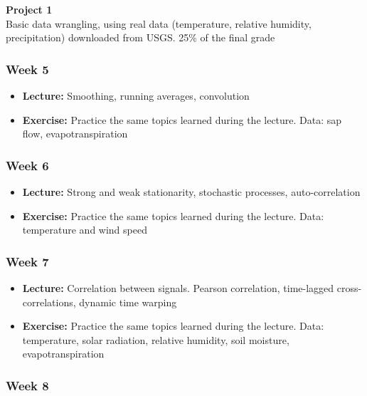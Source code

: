 \documentclass[
  letterpaper,
  DIV=11,
  numbers=noendperiod,
  oneside]{scrreprt}
\providecommand{\tightlist}{%
  \setlength{\itemsep}{0pt}\setlength{\parskip}{0pt}}\usepackage{longtable,booktabs,array}
\begin{document}
\textbf{Project 1}\\
Basic data wrangling, using real data (temperature, relative humidity,
precipitation) downloaded from USGS. 25\% of the final grade

\hypertarget{week-5}{%
\subsubsection*{Week 5}\label{week-5}}

\begin{itemize}
\tightlist
\item
  \textbf{Lecture:} Smoothing, running averages, convolution
\item
  \textbf{Exercise:} Practice the same topics learned during the
  lecture. Data: sap flow, evapotranspiration
\end{itemize}

\hypertarget{week-6}{%
\subsubsection*{Week 6}\label{week-6}}

\begin{itemize}
\tightlist
\item
  \textbf{Lecture:} Strong and weak stationarity, stochastic processes,
  auto-correlation
\item
  \textbf{Exercise:} Practice the same topics learned during the
  lecture. Data: temperature and wind speed
\end{itemize}

\hypertarget{week-7}{%
\subsubsection*{Week 7}\label{week-7}}

\begin{itemize}
\tightlist
\item
  \textbf{Lecture:} Correlation between signals. Pearson correlation,
  time-lagged cross-correlations, dynamic time warping
\item
  \textbf{Exercise:} Practice the same topics learned during the
  lecture. Data: temperature, solar radiation, relative humidity, soil
  moisture, evapotranspiration
\end{itemize}

\hypertarget{week-8}{%
\subsubsection*{Week 8}\label{week-8}}
\end{document}
